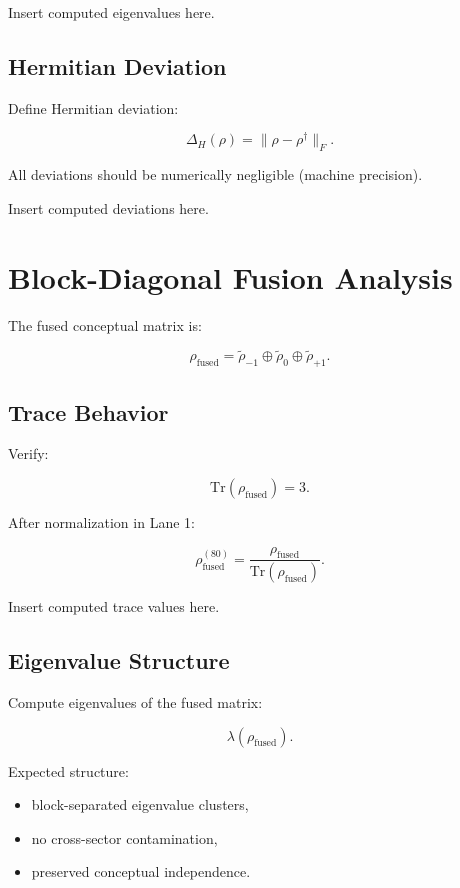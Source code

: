 \documentclass[11pt]{article}
\begin{document}
Insert computed eigenvalues here.

\subsection{Hermitian Deviation}

Define Hermitian deviation:

\[
\Delta_H(\rho) = \|\rho - \rho^\dagger\|_F.
\]

All deviations should be numerically negligible (machine precision).

Insert computed deviations here.

\section{Block-Diagonal Fusion Analysis}

The fused conceptual matrix is:

\[
\rho_{\text{fused}} =
\tilde{\rho}_{-1} \oplus \tilde{\rho}_{0} \oplus \tilde{\rho}_{+1}.
\]

\subsection{Trace Behavior}

Verify:

\[
\mathrm{Tr}(\rho_{\text{fused}}) = 3.
\]

After normalization in Lane 1:

\[
\rho_{\text{fused}}^{(80)} = \frac{\rho_{\text{fused}}}{\mathrm{Tr}(\rho_{\text{fused}})}.
\]

Insert computed trace values here.

\subsection{Eigenvalue Structure}

Compute eigenvalues of the fused matrix:

\[
\lambda(\rho_{\text{fused}}).
\]

Expected structure:

\begin{itemize}
    \item block-separated eigenvalue clusters,
    \item no cross-sector contamination,
    \item preserved conceptual independence.
\end{itemize}
\end{document}
